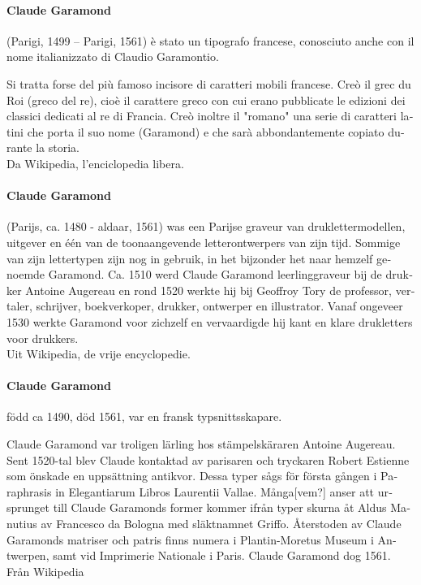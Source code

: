 \documentclass[pagesize,DIV14]{scrartcl}
\begin{document}
\begin{multicols}{2}
\begin{italian}
\paragraph*{Claude Garamond} (Parigi, 1499 – Parigi, 1561) è stato un tipografo francese, conosciuto anche con il nome italianizzato di Claudio Garamontio.

Si tratta forse del più famoso incisore di caratteri mobili francese. Creò il grec du Roi (greco del re), cioè il carattere greco con cui erano pubblicate le edizioni dei classici dedicati al re di Francia. Creò inoltre il "romano" una serie di caratteri latini che porta il suo nome (Garamond) e che sarà abbondantemente copiato durante la storia.\\
{\scriptsize Da Wikipedia, l'enciclopedia libera.}
\end{italian}
\begin{dutch}
\paragraph*{Claude Garamond} (Parijs, ca. 1480 - aldaar, 1561) was een Parijse graveur van druklettermodellen, uitgever en één van de toonaangevende letterontwerpers van zijn tijd. Sommige van zijn lettertypen zijn nog in gebruik, in het bijzonder het naar hemzelf genoemde Garamond. Ca. 1510 werd Claude Garamond leerlinggraveur bij de drukker Antoine Augereau en rond 1520 werkte hij bij Geoffroy Tory de professor, vertaler, schrijver, boekverkoper, drukker, ontwerper en illustrator. Vanaf ongeveer 1530 werkte Garamond voor zichzelf en vervaardigde hij kant en klare drukletters voor drukkers.\\
{\scriptsize Uit Wikipedia, de vrije encyclopedie.}
\end{dutch}
\begin{swedish}
\paragraph*{Claude Garamond} född ca 1490, död 1561, var en fransk typsnittsskapare.

Claude Garamond var troligen lärling hos stämpelskäraren Antoine Augereau. Sent 1520-tal blev Claude kontaktad av parisaren och tryckaren Robert Estienne som önskade en uppsättning antikvor. Dessa typer sågs för första gången i Paraphrasis in Elegantiarum Libros Laurentii Vallae. Många[vem?] anser att ursprunget till Claude Garamonds former kommer ifrån typer skurna åt Aldus Manutius av Francesco da Bologna med släktnamnet Griffo. Återstoden av Claude Garamonds matriser och patris finns numera i Plantin-Moretus Museum i Antwerpen, samt vid Imprimerie Nationale i Paris. Claude Garamond dog 1561.\\
{\scriptsize Från Wikipedia}
\end{swedish}
\begin{finnish}

\end{finnish}
\end{multicols}
\end{document}

